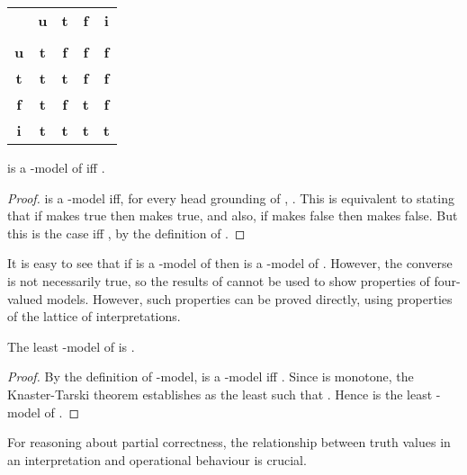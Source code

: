 \documentclass{tlp}
\begin{document}
\begin{center}
\begin{tabular}{|c||c|c|c|c|}
\cline{1-5}
 & \textbf{u} & \textbf{t} & \textbf{f} & \textbf{i}\\
\cline{1-5}
\vspace{-3.9mm} & & & & \\
\cline{1-5}
\textbf{u}          & \textbf{t} & \textbf{f} & \textbf{f} & \textbf{f}\\
\cline{1-5}
\textbf{t}          & \textbf{t} & \textbf{t} & \textbf{f} & \textbf{f}\\
\cline{1-5}
\textbf{f}          & \textbf{t} & \textbf{f} & \textbf{t} & \textbf{f}\\
\cline{1-5}
\textbf{i}          & \textbf{t} & \textbf{t} & \textbf{t} & \textbf{t}\\
\cline{1-5}
\end{tabular}
\end{center}


\begin{proposition} \rm
\label{prop-fourval-sqsubset}
 is a -model of  iff .
\end{proposition}

\begin{proof}
 is a -model iff,
for every head grounding  of , .  
This is equivalent to stating that 
if  makes  true then  makes  true, and also,
if  makes  false then  makes  false.
But this is the case iff ,
by the definition of .
\end{proof}
It is easy to see that if  is a -model of  
then  is a -model of .
However, the converse is not 
necessarily true, so the results of 
cannot be used to show properties of four-valued models.  
However, such properties can be proved directly,
using properties of the lattice of interpretations.


\begin{proposition} \rm
\label{prop-lfp-lmod}
The least -model of  is .
\end{proposition}
\begin{proof}
By the definition of -model,  is a 
-model iff .
Since  is monotone,
the Knaster-Tarski theorem \cite{Tarski} establishes
 as the least  such that .
Hence  is the least -model of .
\end{proof}
For reasoning about partial correctness, the relationship between truth
values in an interpretation and operational behaviour is crucial.
\end{document}
